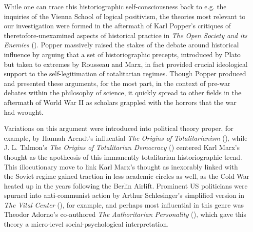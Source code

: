 \documentclass[11pt]{article}
\begin{document}
While one can trace this historiographic self-consciousness back to e.g. the inquiries of the Vienna School of logical positivism, the theories most relevant to our investigation were formed in the aftermath of Karl Popper's critiques of theretofore-unexamined aspects of historical practice in \textit{The Open Society and its Enemies} (\cite{popper_open_1945}). Popper massively raised the stakes of the debate around historical influence by arguing that a set of historiographic precepts, introduced by Plato but taken to extremes by Rousseau and Marx, in fact provided crucial ideological support to the self-legitimation of totalitarian regimes. Though Popper produced and presented these arguments, for the most part, in the context of pre-war debates within the philosophy of science, it quickly spread to other fields in the aftermath of World War II as scholars grappled with the horrors that the war had wrought.

Variations on this argument were introduced into political theory proper, for example, by Hannah Arendt's influential \textit{The Origins of Totalitarianism} (\cite{arendt_origins_1951}), while J. L. Talmon's \textit{The Origins of Totalitarian Democracy} (\cite{talmon_origins_1952}) centered Karl Marx's thought as the apotheosis of this immanently-totalitarian historiographic trend. This illocutionary move to link Karl Marx's thought as inexorably linked with the Soviet regime gained traction in less academic circles as well,  as the Cold War heated up in the years following the Berlin Airlift. Prominent US politicians were spurned into anti-communist action by Arthur Schlesinger's simplified version in \textit{The Vital Center} (\cite{schlesinger_vital_1949}), for example, and perhaps most influential in this genre was Theodor Adorno's co-authored \textit{The Authoritarian Personality} (\cite{adorno_authoritarian_1950}), which gave this theory a micro-level social-psychological interpretation.

\end{document}
